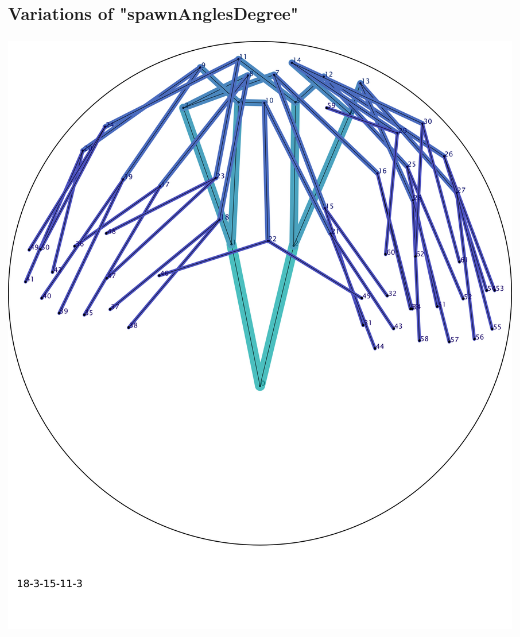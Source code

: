 \documentclass{scrartcl}
\newcommand{\imgSize}{0.46}
\begin{document}
\newpage
\subsubsection{Variations of "spawnAnglesDegree"}
\begin{minipage}[t]{\imgSize\textwidth}
\includegraphics[width=\textwidth]{img_18-3-15-11-3}
\end{minipage}
\hspace{0.5cm}
\end{document}
